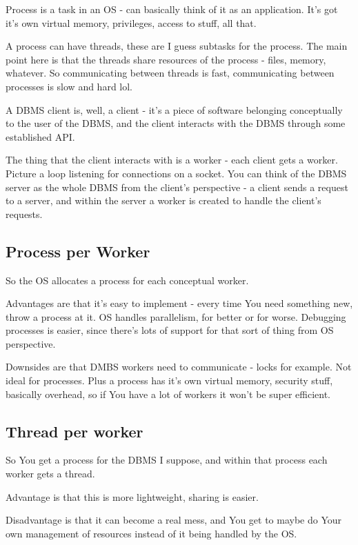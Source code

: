 \documentclass{article}
\begin{document}
			Process is a task in an OS - can basically think of it as an application. It's got it's own virtual memory, privileges, access to stuff, all that.
			
			A process can have threads, these are I guess subtasks for the process. The main point here is that the threads share resources of the process - files, memory, whatever. So communicating between threads is fast, communicating between processes is slow and hard lol.
			
			A DBMS client is, well, a client - it's a piece of software belonging conceptually to the user of the DBMS, and the client interacts with the DBMS through some established API. 
			
			The thing that the client interacts with is a worker - each client gets a worker. Picture a loop listening for connections on a socket. You can think of the DBMS server as the whole DBMS from the client's perspective - a client sends a request to a server, and within the server a worker is created to handle the client's requests.
			
		\subsection{Process per Worker}
		
			So the OS allocates a process for each conceptual worker. 
			
			Advantages are that it's easy to implement - every time You need something new, throw a process at it. OS handles parallelism, for better or for worse. Debugging processes is easier, since there's lots of support for that sort of thing from OS perspective.
			
			Downsides are that DMBS workers need to communicate - locks for example. Not ideal for processes. Plus a process has it's own virtual memory, security stuff, basically overhead, so if You have a lot of workers it won't be super efficient.
			
		\subsection{Thread per worker}
	
			So You get a process for the DBMS I suppose, and within that process each worker gets a thread.
			
			Advantage is that this is more lightweight, sharing is easier.
			
			Disadvantage is that it can become a real mess, and You get to maybe do Your own management of resources instead of it being handled by the OS.
			
\end{document}
